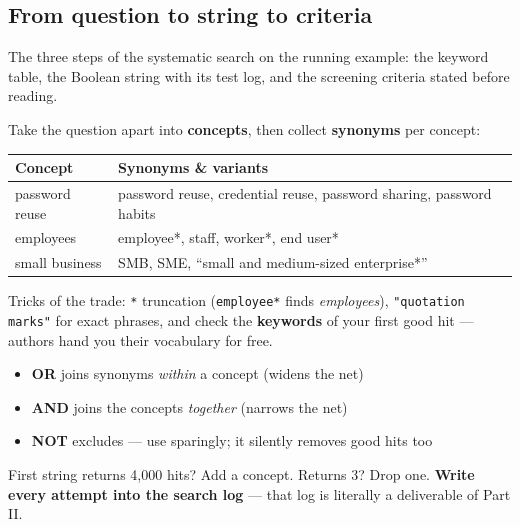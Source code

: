 \documentclass[11pt,a4paper,british,twoside=false,headings=small,chapterprefix=false,numbers=noenddot]{scrbook}
\newenvironment{alertblock}[1]{\begin{tcolorbox}[scriptbox, colframe=uiared, colback=uiamutedred, title={#1}]}{\end{tcolorbox}}
\begin{document}
\subsection{From question to string to criteria}
The three steps of the systematic search on the running example: the keyword table, the Boolean string with its test log, and the screening criteria stated before reading.
\begin{center}\small
Take the question apart into \textbf{concepts}, then collect
  \textbf{synonyms} per concept:
  
  \small
  \renewcommand{\arraystretch}{1.35}
  \begin{tabular}{@{}p{3.6cm}p{9.6cm}@{}}
    \toprule
    \textbf{Concept} & \textbf{Synonyms \& variants}\\
    \midrule
    password reuse & password reuse, credential reuse, password sharing, password habits\\
    employees & employee*, staff, worker*, end user*\\
    small business & SMB, SME, ``small and medium-sized enterprise*''\\
    \bottomrule
  \end{tabular}
  

  Tricks of the trade: \texttt{*} truncation (\texttt{employee*} finds
  \emph{employees}), \texttt{"quotation marks"} for exact phrases, and
  check the \textbf{keywords} of your first good hit --- authors hand you
  their vocabulary for free.
\end{center}

\begin{center}\small
\begin{center}
  \end{center}
  
  \begin{itemize}\setlength{\itemsep}{0.4em}
    \item \textbf{OR} joins synonyms \emph{within} a concept
          (widens the net)
    \item \textbf{AND} joins the concepts \emph{together}
          (narrows the net)
    \item \textbf{NOT} excludes --- use sparingly; it silently removes good
          hits too
  \end{itemize}
  
  \begin{alertblock}{Iterate and log}
    First string returns 4{,}000 hits? Add a concept. Returns 3? Drop one.
    \textbf{Write every attempt into the search log} --- that log is
    literally a deliverable of Part II.
  \end{alertblock}
\end{center}
\end{document}
